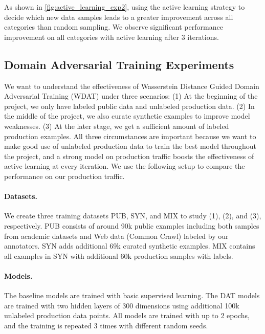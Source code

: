 \documentclass[letterpaper]{article} %
\begin{document}
As shown in \cref{fig:active_learning_exp2}, using the active learning strategy to decide which new data samples leads to a greater improvement across all categories than random sampling. We observe significant performance improvement on all categories with active learning after 3 iterations.


\subsection{Domain Adversarial Training Experiments}
\label{sec:exp-dat}

We want to understand the effectiveness of Wasserstein Distance Guided Domain Adversarial Training (WDAT) under three scenarios:
(1) At the beginning of the project, we only have labeled public data and unlabeled production data.
(2) In the middle of the project, we also curate synthetic examples to improve model weaknesses.
(3) At the later stage, we get a sufficient amount of labeled production examples.
All three circumstances are important because we want to make good use of unlabeled production data to train the best model throughout the project, and a strong model on production traffic boosts the effectiveness of active learning at every iteration. We use the following setup to compare the performance on our production traffic.

\paragraph{Datasets.} We create three training datasets PUB, SYN, and MIX to study (1), (2), and (3), respectively. PUB consists of around 90k public examples including both samples from academic datasets and Web data (Common Crawl) labeled by our annotators. SYN adds additional 69k curated synthetic examples. MIX contains all examples in SYN with additional 60k production samples with labels. 

\paragraph{Models.} The baseline models are trained with basic supervised learning. The DAT models are trained with two hidden layers of 300 dimensions using additional 100k unlabeled production data points. All models are trained with up to 2 epochs, and the training is repeated 3 times with different random seeds.
\end{document}
